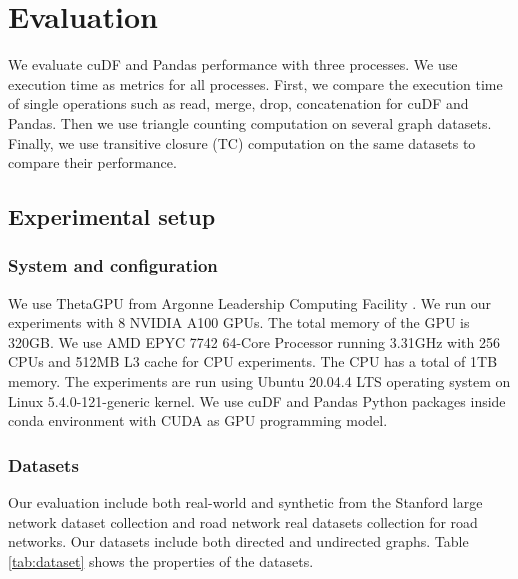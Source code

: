 \section{Evaluation}
We evaluate cuDF and Pandas performance with three processes. We use execution time as metrics for all processes. First, we compare the execution time of single operations such as read, merge, drop, concatenation for cuDF and Pandas. Then we use triangle counting computation on several graph datasets. Finally, we use transitive closure (TC) computation on the same datasets to compare their performance. 

\subsection{Experimental setup}

\subsubsection{System and configuration}
We use ThetaGPU from Argonne Leadership Computing Facility \cite{theta_2022}. We run our experiments with 8 NVIDIA A100 GPUs. The total memory of the GPU is 320GB. We use AMD EPYC 7742 64-Core Processor running 3.31GHz with 256 CPUs and 512MB L3 cache for CPU experiments. The CPU has a total of 1TB memory. The experiments are run using Ubuntu 20.04.4 LTS operating system on Linux 5.4.0-121-generic kernel. We use cuDF and Pandas Python packages inside conda environment with CUDA as GPU programming model. 

\subsubsection{Datasets}
Our evaluation include both real-world and synthetic from the Stanford large network dataset collection and road network real datasets collection for road networks\cite{snapnets, li2005trip}. Our datasets include both directed and undirected graphs. Table \ref{tab:dataset} shows the properties of the datasets. 

